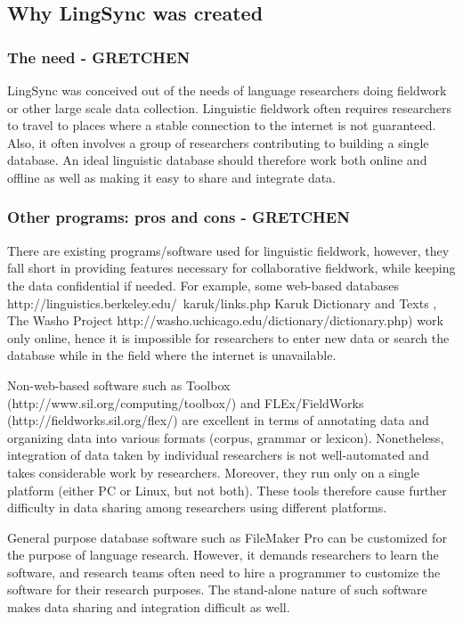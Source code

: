 \documentclass[letterpaper, 12pt, dvips]{mitwpl}
\begin{document}
\subsection{Why LingSync was created}
\subsubsection{The need - GRETCHEN}

LingSync was conceived out of the needs of language researchers doing
fieldwork or other large scale data collection. Linguistic fieldwork often requires researchers
to travel to places where a stable connection to the internet is not guaranteed.
Also, it often involves a group of researchers contributing to building a single database.
An ideal linguistic database should therefore work both online and offline as well as
making it easy to share and integrate data.

\subsubsection{Other programs: pros and cons - GRETCHEN}



There are existing programs/software used for linguistic fieldwork, however, they
fall short in providing features necessary for collaborative fieldwork, while keeping
the data confidential if needed. For example, some web-based databases http://linguistics.berkeley.edu/~karuk/links.php Karuk
Dictionary and Texts , The Washo Project
http://washo.uchicago.edu/dictionary/dictionary.php) work only online, hence it is
impossible for researchers to enter new data or search the database while in the field
where the internet is unavailable.

Non-web-based software such as Toolbox (http://www.sil.org/computing/toolbox/)
and FLEx/FieldWorks (http://fieldworks.sil.org/flex/) are excellent in terms of annotating
data and organizing data into various formats (corpus, grammar or lexicon).
Nonetheless, integration of data taken by individual researchers is not well-automated
and takes considerable work by researchers. Moreover, they run only on a single platform
(either PC or Linux, but not both). These tools therefore cause further difficulty in
data sharing among researchers using different platforms.

General purpose database software such as FileMaker Pro can be customized for the
purpose of language research. However, it demands researchers to learn the software,
and research teams often need to hire a programmer to customize the software for their
research purposes. The stand-alone nature of such software makes data sharing and
integration difficult as well.
\end{document}
